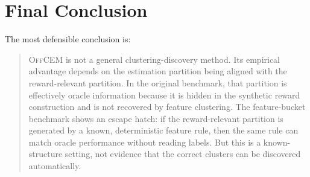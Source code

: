 \documentclass[11pt]{article}
\newcommand{\OffCEM}{\textsc{OffCEM}}
\begin{document}
\section{Final Conclusion}

The most defensible conclusion is:

\begin{quote}
\OffCEM{} is not a general clustering-discovery method. Its empirical advantage
depends on the estimation partition being aligned with the reward-relevant
partition. In the original benchmark, that partition is effectively oracle
information because it is hidden in the synthetic reward construction and is
not recovered by feature clustering. The feature-bucket benchmark shows an
escape hatch: if the reward-relevant partition is generated by a known,
deterministic feature rule, then the same rule can match oracle performance
without reading labels. But this is a known-structure setting, not evidence that
the correct clusters can be discovered automatically.
\end{quote}
\end{document}
